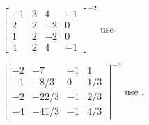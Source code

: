 \begin{exercise}
\begin{parts}
\item \(\begin{bmatrix} -1&3&4&-1
\\2&2&-2&0
\\1&2&-2&0
\\4&2&4&-1 \end{bmatrix}^{-2}\) use \script
{}

\item \(\begin{bmatrix} -2&-7&-1&1
\\-1&-8/3&0&1/3
\\-2&-22/3&-1&2/3
\\-4&-41/3&-1&4/3 \end{bmatrix}^{-3}\) use \script.

\end{parts}
\end{exercise}




